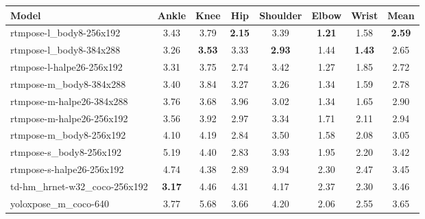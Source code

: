 \begin{table}[htbp]
    \setlength{\tabcolsep}{4pt}

    \begin{tabular}{l ccccccc}
        \toprule
        \textbf{Model}                   & \textbf{Ankle} & \textbf{Knee} & \textbf{Hip}  & \textbf{Shoulder} & \textbf{Elbow} & \textbf{Wrist} & \textbf{Mean} \\

        \midrule
        rtmpose-l\_body8-256x192         & 3.43           & 3.79          & \textbf{2.15} & 3.39              & \textbf{1.21}  & 1.58           & \textbf{2.59} \\
        rtmpose-l\_body8-384x288         & 3.26           & \textbf{3.53} & 3.33          & \textbf{2.93}     & 1.44           & \textbf{1.43}  & 2.65          \\
        rtmpose-l-halpe26-256x192        & 3.31           & 3.75          & 2.74          & 3.42              & 1.27           & 1.85           & 2.72          \\
        rtmpose-m\_body8-384x288         & 3.40           & 3.84          & 3.27          & 3.26              & 1.34           & 1.59           & 2.78          \\
        rtmpose-m-halpe26-384x288        & 3.76           & 3.68          & 3.96          & 3.02              & 1.34           & 1.65           & 2.90          \\
        rtmpose-m-halpe26-256x192        & 3.56           & 3.92          & 2.97          & 3.34              & 1.71           & 2.11           & 2.94          \\
        rtmpose-m\_body8-256x192         & 4.10           & 4.19          & 2.84          & 3.50              & 1.58           & 2.08           & 3.05          \\
        rtmpose-s\_body8-256x192         & 5.19           & 4.40          & 2.83          & 3.93              & 1.95           & 2.20           & 3.42          \\
        rtmpose-s-halpe26-256x192        & 4.74           & 4.38          & 2.89          & 3.94              & 2.30           & 2.47           & 3.45          \\
        td-hm\_hrnet-w32\_coco-256x192   & \textbf{3.17}  & 4.46          & 4.31          & 4.17              & 2.37           & 2.30           & 3.46          \\
        yoloxpose\_m\_coco-640           & 3.77           & 5.68          & 3.66          & 4.20              & 2.06           & 2.55           & 3.65          \\

\end{tabular}
\end{table}
